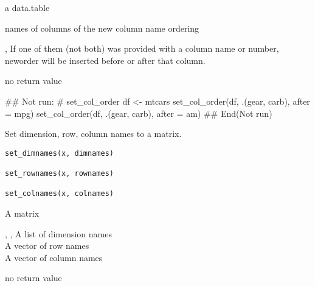 \documentclass[letterpaper]{book}
\begin{document}
%
\begin{Arguments}
\begin{ldescription}
\item[\code{df}] a data.table

\item[\code{neworder}] names of columns of the new column name ordering

\item[\code{before}, \code{after}] If one of them (not both) was provided with a column name or number, neworder will be inserted before or after that column.
\end{ldescription}
\end{Arguments}
%
\begin{Value}
no return value
\end{Value}
%
\begin{Examples}
\begin{ExampleCode}
## Not run: 
# set_col_order
df <- mtcars
set_col_order(df, .(gear, carb), after = mpg)
set_col_order(df, .(gear, carb), after = am)
## End(Not run)

\end{ExampleCode}
\end{Examples}
%
\begin{Description}
Set dimension, row, column names to a matrix.
\end{Description}
%
\begin{Usage}
\begin{verbatim}
set_dimnames(x, dimnames)

set_rownames(x, rownames)

set_colnames(x, colnames)
\end{verbatim}
\end{Usage}
%
\begin{Arguments}
\begin{ldescription}
\item[\code{x}] A matrix

\item[\code{dimnames}, \code{rownames}, \code{colnames}] A list of dimension names\\{}
A vector of row names\\{}
A vector of column names
\end{ldescription}
\end{Arguments}
%
\begin{Value}
no return value
\end{Value}
\end{document}
